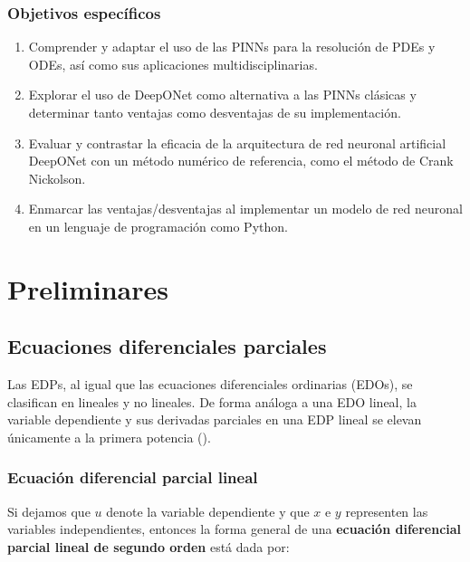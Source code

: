 \documentclass[
  spanish,
  us-letterpaper,
]{scrreprt}
\theoremstyle{definition}
\theoremstyle{plain}
\theoremstyle{remark}
\begin{document}
\section{Objetivos específicos}\label{objetivos-especuxedficos}

\begin{enumerate}
\def\labelenumi{\arabic{enumi}.}
\item
  Comprender y adaptar el uso de las PINNs para la resolución de PDEs y
  ODEs, así como sus aplicaciones multidisciplinarias.
\item
  Explorar el uso de DeepONet como alternativa a las PINNs clásicas y
  determinar tanto ventajas como desventajas de su implementación.
\item
  Evaluar y contrastar la eficacia de la arquitectura de red neuronal
  artificial DeepONet con un método numérico de referencia, como el
  método de Crank Nickolson.
\item
  Enmarcar las ventajas/desventajas al implementar un modelo de red
  neuronal en un lenguaje de programación como Python.
\end{enumerate}

\part{Preliminares}

\chapter{Ecuaciones diferenciales
parciales}\label{ecuaciones-diferenciales-parciales}

Las EDPs, al igual que las ecuaciones diferenciales ordinarias (EDOs),
se clasifican en lineales y no lineales. De forma análoga a una EDO
lineal, la variable dependiente y sus derivadas parciales en una EDP
lineal se elevan únicamente a la primera potencia
().

\section{Ecuación diferencial parcial
lineal}\label{ecuaciuxf3n-diferencial-parcial-lineal}

Si dejamos que \(u\) denote la variable dependiente y que \(x\) e \(y\)
representen las variables independientes, entonces la forma general de
una \textbf{ecuación diferencial parcial lineal de segundo orden} está
dada por:
\end{document}
